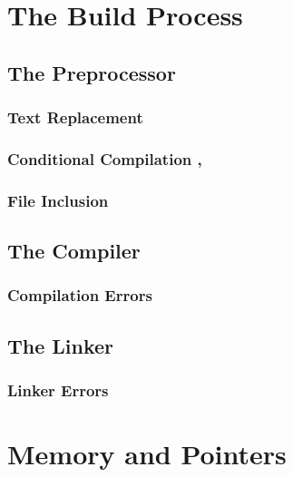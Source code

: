 \documentclass{article}
\title{\thistitle}
\author{\me}
\date{\today}
\begin{document}
\maketitle
\tableofcontents
\pagebreak

\section{The Build Process}

\subsection{The Preprocessor}

\subsubsection{Text Replacement }

\subsubsection{Conditional Compilation , }

\subsubsection{File Inclusion }

\subsection{The Compiler}

\subsubsection{Compilation Errors}

\subsection{The Linker}

\subsubsection{Linker Errors}

\section{Memory and Pointers}
\end{document}
